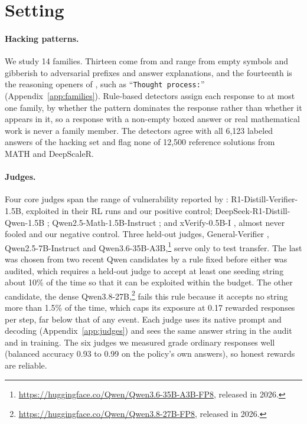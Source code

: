 \documentclass[11pt]{article}
\newcommand{\str}[1]{``\texttt{#1}''}
\begin{document}
\section{Setting}
\label{sec:setting}

\paragraph{Hacking patterns.} We study 14 families. Thirteen come from \citet{huang2025accuracy} and range from
empty symbols and gibberish to adversarial prefixes and answer explanations, and the fourteenth is the reasoning
openers of \citet{zhao2025onetoken}, such as \str{Thought process:} (Appendix~\ref{app:families}). Rule-based detectors assign each response to at most
one family, by whether the pattern dominates the response rather than whether it appears in it, so a response with a
non-empty boxed answer or real mathematical work is never a family member. The detectors agree with all 6,123
labeled answers of the hacking set and flag none of 12,500 reference solutions from MATH and DeepScaleR.

\paragraph{Judges.} Four core judges span the range of vulnerability reported by \citet{huang2025accuracy}:
R1-Distill-Verifier-1.5B, exploited in their RL runs and our positive control; DeepSeek-R1-Distill-Qwen-1.5B
\citep{deepseek2025r1}; Qwen2.5-Math-1.5B-Instruct \citep{yang2024qwen25math}; and xVerify-0.5B-I
\citep{chen2025xverify}, almost never fooled and our negative control. Three held-out judges, General-Verifier
\citep{ma2025generalreasoner}, Qwen2.5-7B-Instruct \citep{qwen2025qwen25} and
Qwen3.6-35B-A3B,\footnote{\url{https://huggingface.co/Qwen/Qwen3.6-35B-A3B-FP8}, released in 2026.} serve only to
test transfer. The last was chosen from two recent Qwen candidates by a rule fixed before either was audited, which
requires a held-out judge to accept at least one seeding string about 10\% of the time so that it can be exploited
within the budget. The other candidate, the dense
Qwen3.8-27B,\footnote{\url{https://huggingface.co/Qwen/Qwen3.8-27B-FP8}, released in 2026.} fails this rule because
it accepts no string more than 1.5\% of the time, which caps its exposure at 0.17 rewarded responses per step, far
below that of any event. Each judge uses its native prompt and decoding (Appendix~\ref{app:judges}) and sees the
same answer string in the audit and in training. The six judges we measured grade ordinary responses well
(balanced accuracy 0.93 to 0.99 on the policy's own answers), so honest rewards are reliable.
\end{document}
